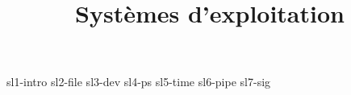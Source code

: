 \documentclass {beamer}
\title {Systèmes d'exploitation}
\begin{document}

 {sl1-intro}
 {sl2-file}
 {sl3-dev}
 {sl4-ps}
 {sl5-time}
 {sl6-pipe}
 {sl7-sig}
\end{document}
